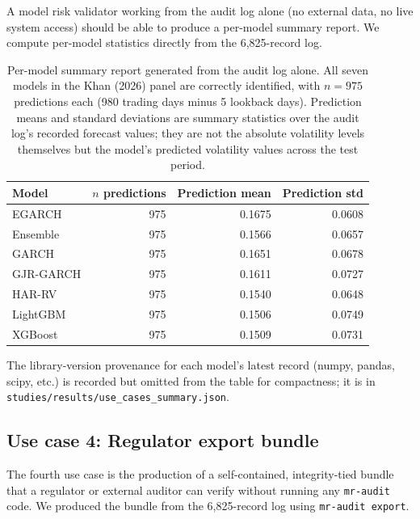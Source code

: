 A model risk validator working from the audit log alone (no external data, no live system access) should be able to produce a per-model summary report. We compute per-model statistics directly from the 6,825-record log.

\begin{table}[H]
\centering
\caption{Per-model summary report generated from the audit log alone. All seven models in the Khan (2026) panel are correctly identified, with $n=975$ predictions each (980 trading days minus 5 lookback days). Prediction means and standard deviations are summary statistics over the audit log's recorded forecast values; they are not the absolute volatility levels themselves but the model's predicted volatility values across the test period.}\label{tab:validation}
\footnotesize
\begin{tabular}{lrrr}
\toprule
Model & $n$ predictions & Prediction mean & Prediction std \\
\midrule
EGARCH    & 975 & 0.1675 & 0.0608 \\
Ensemble  & 975 & 0.1566 & 0.0657 \\
GARCH     & 975 & 0.1651 & 0.0678 \\
GJR-GARCH & 975 & 0.1611 & 0.0727 \\
HAR-RV    & 975 & 0.1540 & 0.0648 \\
LightGBM  & 975 & 0.1506 & 0.0749 \\
XGBoost   & 975 & 0.1509 & 0.0731 \\
\bottomrule
\end{tabular}
\end{table}

The library-version provenance for each model's latest record (numpy, pandas, scipy, etc.) is recorded but omitted from the table for compactness; it is in \texttt{studies/results/use\_cases\_summary.json}.

\subsection{Use case 4: Regulator export bundle}\label{sec:demonstration_export}

The fourth use case is the production of a self-contained, integrity-tied bundle that a regulator or external auditor can verify without running any \texttt{mr-audit} code. We produced the bundle from the 6,825-record log using \texttt{mr-audit export}.


